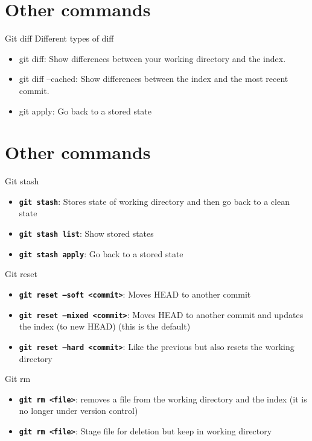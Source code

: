 \documentclass[12pt]{beamer}
\begin{document}
\section{Other commands}

\begin{frame}{Git diff}
	Different types of diff
	\begin{itemize}
    \item git diff: Show differences between your working directory and the index.
    \item git diff –cached: Show differences between the index and the most recent commit.
    \item git apply: Go back to a stored state
	\end{itemize}	
\end{frame}	

\section{Other commands}

\begin{frame}{Git stash}
	\begin{itemize}
		\item \textbf{\texttt{git stash}}: Stores state of working directory and then go back to a clean state
		\item \textbf{\texttt{git stash list}}: Show stored states
		\item \textbf{\texttt{git stash apply}}: Go back to a stored state
	\end{itemize}	
\end{frame}	

\begin{frame}{Git reset}
	\begin{itemize}
		\item \textbf{\texttt{git reset --soft <commit>}}: Moves HEAD to another commit
		\item \textbf{\texttt{git reset --mixed <commit>}}: Moves HEAD to another commit and updates the index (to new HEAD) (this is the default)
		\item \textbf{\texttt{git reset --hard <commit>}}: Like the previous but also resets the working directory
	\end{itemize}	
\end{frame}	

\begin{frame}{Git rm}
	\begin{itemize}
		\item \textbf{\texttt{git rm  <file>}}: removes a file from the working directory and the index (it is no longer under version control)
		\item \textbf{\texttt{git rm <file>}}: Stage file for deletion but keep in working directory
	\end{itemize}	
\end{frame}	
\end{document}
